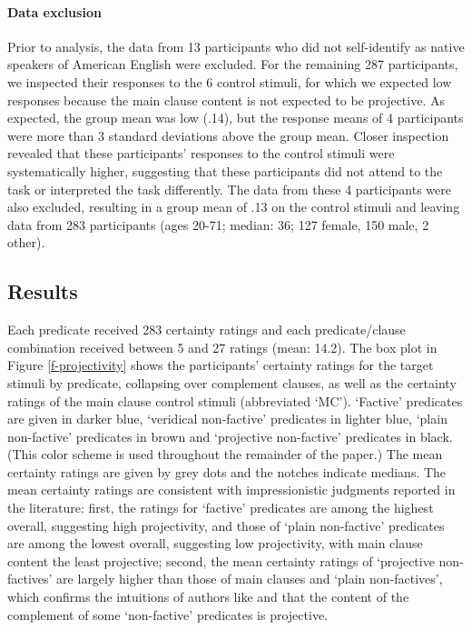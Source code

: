 \documentclass[11pt,fleqn]{article}
\newcommand{\6}{\mbox{$[\hspace*{-.6mm}[$}}
\newcommand{\9}{\mbox{$]\hspace*{-.6mm}]$}}
\newcommand{\citetpos}[1]{\citeauthor{#1}'s (\citeyear{#1})}
\begin{document}
\paragraph{Data exclusion}
Prior to analysis, the data from 13 participants who did not self-identify as native speakers of American English were excluded. For the remaining 287 participants, we inspected their responses to the 6 control stimuli, for which we expected low responses because the main clause content is not expected to be projective. As expected, the group mean was low (.14), but the response means of 4 participants were more than 3 standard deviations above the group mean. Closer inspection revealed that these participants' responses to the control stimuli were systematically higher, suggesting that these participants did not attend to the task or interpreted the task differently. The data from these 4 participants were also excluded, resulting in a group mean of .13 on the control stimuli and leaving data from 283 participants (ages 20-71; median: 36; 127 female, 150 male, 2 other).

\subsection{Results}

Each predicate received 283 certainty ratings and each predicate/clause combination received between 5 and 27 ratings (mean: 14.2). The box plot in Figure \ref{f-projectivity} shows the participants' certainty ratings for the target stimuli by predicate, collapsing over complement clauses, as well as the certainty ratings of the main clause control stimuli (abbreviated `MC'). `Factive' predicates are given in darker blue, `veridical non-factive' predicates in lighter blue, `plain non-factive' predicates in brown and `projective non-factive' predicates in black. (This color scheme is used throughout the remainder of the paper.) The mean certainty ratings are given by grey dots and the notches indicate medians. 
The mean certainty ratings are consistent with impressionistic judgments reported in the literature: first, the ratings for `factive' predicates are among the highest overall, suggesting high projectivity, and those of `plain non-factive' predicates are among the lowest overall, suggesting low projectivity, with main clause content the least projective; second, the mean certainty ratings of `projective non-factives' are largely higher than those of main clauses and `plain non-factives', which confirms the intuitions of authors like \citet{schlenker10,anand-hacquard2014} and \citet{spector-egre2015} that the content of the complement of some `non-factive' predicates is projective.
\end{document}
